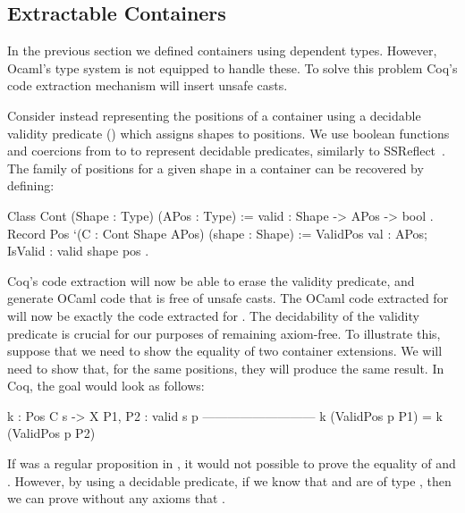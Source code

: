 \documentclass[ a4paper, UKenglish, cleveref, autoref, thm-restate]{lipics-v2021}
\begin{document}
\subsection{Extractable Containers}
In the previous section we defined containers using dependent types.  However,
Ocaml's type system is not equipped to handle these. To solve this problem
Coq's code extraction mechanism will insert unsafe casts.

Consider instead representing the positions of a container using a decidable
validity predicate () which assigns shapes to positions. We use
boolean functions and coercions from  to  to represent
decidable predicates, similarly to SSReflect~\cite{GonthierL09}. The family of
positions for a given shape in a container can be recovered by defining:
\begin{coqcode}
Class Cont (Shape : Type) (APos : Type) := { valid : Shape -> APos -> bool }.
Record Pos `(C : Cont Shape APos) (shape : Shape) :=
  ValidPos { val : APos; IsValid : valid shape pos }.
\end{coqcode}
Coq's code extraction will now be able to erase the validity predicate, and
generate OCaml code that is free of unsafe casts. The OCaml code extracted for
 will now be exactly the code extracted for .
The decidability of the validity predicate is crucial for our purposes of 
remaining axiom-free. To illustrate this, suppose that we need to show
the equality of two container extensions. We will need to show that, for
the same positions, they will produce the same result. In Coq, the goal
would look as follows: 
\begin{coqcode}
 k : Pos C s -> X
 P1, P2 : valid s p
 ---------------------------
 k (ValidPos p P1) = k (ValidPos p P2)
\end{coqcode}
If  was a regular proposition in , it would not possible
to prove the equality of  and . However, by using a decidable
predicate, if we know that  and  are of type 
, then we can prove without any axioms that 
.


\end{document}
